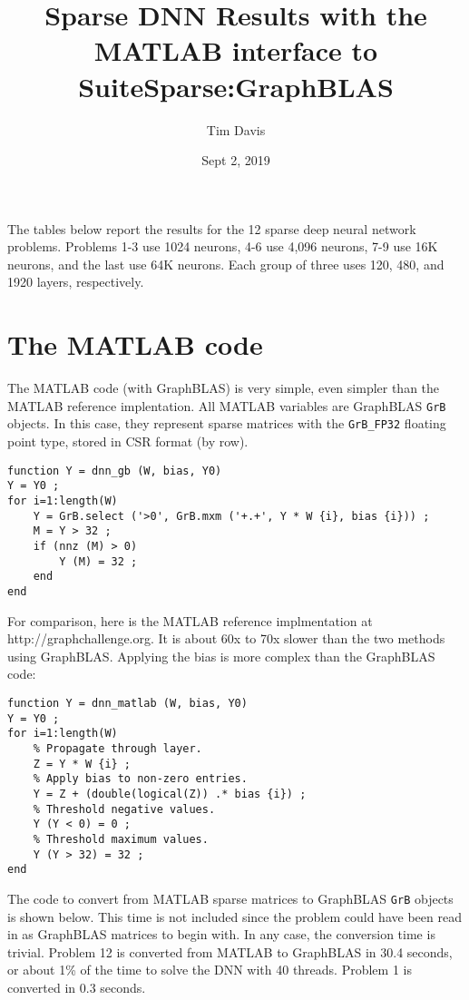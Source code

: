 \documentclass[12pt]{article}
\title{Sparse DNN Results with the MATLAB interface to SuiteSparse:GraphBLAS}
\author{Tim Davis}
\date{Sept 2, 2019}
\begin{document}
\maketitle

The tables below report the results for the 12 sparse deep neural network problems.
Problems 1-3 use 1024 neurons, 4-6 use 4,096 neurons, 7-9 use 16K neurons, and the
last use 64K neurons.  Each group of three uses 120, 480, and 1920 layers,
respectively.

\section{The MATLAB code}

The MATLAB code (with GraphBLAS) is very simple, even simpler than the MATLAB
reference implentation.  All MATLAB variables are GraphBLAS \verb'GrB' objects.
In this case, they represent sparse matrices with the \verb'GrB_FP32' floating
point type, stored in CSR format (by row).

{\footnotesize
\begin{verbatim}
function Y = dnn_gb (W, bias, Y0)
Y = Y0 ;
for i=1:length(W)
    Y = GrB.select ('>0', GrB.mxm ('+.+', Y * W {i}, bias {i})) ;
    M = Y > 32 ;
    if (nnz (M) > 0)
        Y (M) = 32 ;
    end
end
\end{verbatim}}

For comparison, here is the MATLAB reference implmentation at \newline
http://graphchallenge.org.  It is about 60x to 70x slower than the two methods
using GraphBLAS.  Applying the bias is more complex than the GraphBLAS code:

{\footnotesize
\begin{verbatim}
function Y = dnn_matlab (W, bias, Y0)
Y = Y0 ;
for i=1:length(W)
    % Propagate through layer.
    Z = Y * W {i} ;
    % Apply bias to non-zero entries.
    Y = Z + (double(logical(Z)) .* bias {i}) ;
    % Threshold negative values.
    Y (Y < 0) = 0 ;
    % Threshold maximum values.
    Y (Y > 32) = 32 ;
end
\end{verbatim}}

The code to convert from MATLAB sparse matrices to GraphBLAS \verb'GrB' objects
is shown below.  This time is not included since the problem could have been
read in as GraphBLAS matrices to begin with.  In any case, the conversion time
is trivial.  Problem 12 is converted from MATLAB to GraphBLAS in 30.4 seconds,
or about 1\% of the time to solve the DNN with 40 threads.  Problem 1 is
converted in 0.3 seconds.
\end{document}
